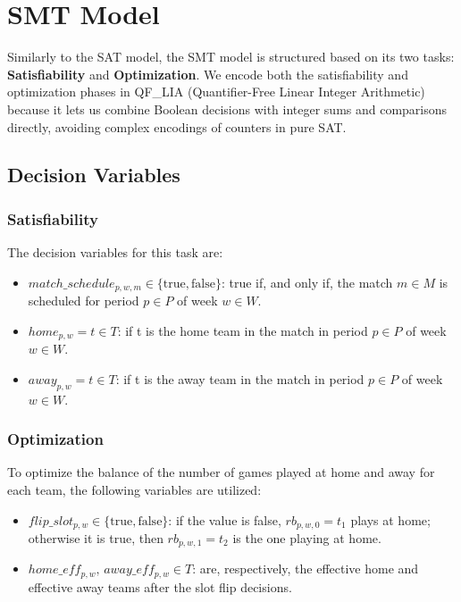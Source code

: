 \section{SMT Model}

Similarly to the SAT model, the SMT model is structured based on its two tasks: \textbf{Satisfiability} and \textbf{Optimization}.
We encode both the satisfiability and optimization phases in QF\_LIA (Quantifier-Free Linear Integer Arithmetic) because it lets us combine Boolean decisions with integer sums and comparisons directly, avoiding complex encodings of counters in pure SAT.

\subsection{Decision Variables}

\subsubsection{Satisfiability}

The decision variables for this task are:
\begin{itemize}
    \item $match\_schedule_{p,w,m} \in \{\text{true}, \text{false}\}$: true if, and only if, the match $m \in M$ is scheduled for period $p \in P$ of week $w \in W$.
    \item $home_{p,w} = t \in T$: if t is the home team in the match in period $p \in P$ of week $w \in W$.
    \item $away_{p,w} = t \in T$: if t is the away team in the match in period $p \in P$ of week $w \in W$.
\end{itemize}

\subsubsection{Optimization}
To optimize the balance of the number of games played at home and away for each team, the following variables are utilized:
\begin{itemize}
    \item $flip\_slot_{p,w} \in \{\text{true}, \text{false}\}$: %
    if the value is false, $rb_{p, w, 0}=t_1$ plays at home; otherwise it is true, then $rb_{p, w, 1}=t_2$ is the one playing at home.
    
    \item $home\_eff_{p,w},\, away\_eff_{p,w} \in T$: are, respectively, the effective home and effective away teams after the slot flip decisions.
\end{itemize}

